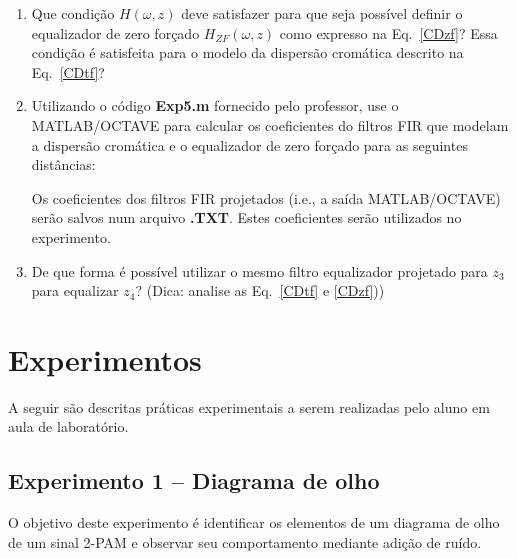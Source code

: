 \documentclass[12pt,addpoints]{exam}
\begin{document}
\begin{enumerate}
    \item Que condição $H(\omega, z)$ deve satisfazer para que seja possível definir o equalizador de zero forçado $H_{ZF}(\omega, z)$ como expresso na Eq.~\ref{CDzf}? Essa condição é satisfeita para o modelo da dispersão cromática descrito na Eq.~\ref{CDtf}?
    \item Utilizando o código \textbf{Exp5.m} fornecido pelo professor, use o MATLAB/OCTAVE para calcular os coeficientes do filtros FIR que modelam a dispersão cromática e o equalizador de zero forçado para as seguintes distâncias:
    Os coeficientes dos filtros FIR projetados (i.e., a saída MATLAB/OCTAVE) serão salvos num arquivo \textbf{.TXT}. Estes coeficientes serão utilizados no experimento.
    \item De que forma é possível utilizar o mesmo filtro equalizador projetado para $z_3$ para equalizar $z_4$? (Dica: analise as Eq.~\ref{CDtf} e \ref{CDzf}))
\end{enumerate}

\section{Experimentos}

A seguir são descritas práticas experimentais a serem realizadas pelo aluno em aula de laboratório. 

\subsection{Experimento 1 -- Diagrama de olho}

O objetivo deste experimento é identificar os elementos de um diagrama de olho de um sinal 2-PAM e observar seu comportamento mediante adição de ruído.
\end{document}
